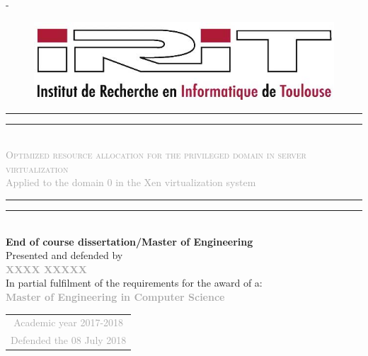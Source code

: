 \begin{titlingpage}
\begin{SingleSpace}

\begin{adjustwidth*}{\unitlength}{-\unitlength}
\begin{figure}
\centering 
\includegraphics[scale=0.5]{logos/IRIT-rd.jpg}
\end{figure}
\hspace{3cm}
\vspace{0.5cm}
\begin{center}
\rule[0.5ex]{\linewidth}{2pt}\vspace*{-\baselineskip}\vspace*{3.2pt}
\rule[0.5ex]{\linewidth}{1pt}\\[\baselineskip]
{\LARGE{\textcolor{darkgray} {\textsc{Optimized resource allocation for the privileged domain in server virtualization}
}}}\\[4mm]
{\Large \textcolor{darkgray}{Applied to the domain 0 in the Xen virtualization system}}\\
\rule[0.5ex]{\linewidth}{1pt}\vspace*{-\baselineskip}\vspace{3.2pt}
\rule[0.5ex]{\linewidth}{2pt}\\
\vspace{6mm}
{\Large \textbf{End of course dissertation/Master of Engineering}}\\
\vspace{6mm}
{\Large Presented and defended by } \\
\vspace{6mm}
{\Large \textsc{\textbf{\textcolor{darkgray}{XXXX XXXXX }}}}\\
\vspace{8mm}
{\Large In partial fulfilment of the requirements for the award of a:} \\
\vspace{6mm}
{\Large \textbf{\textcolor{darkgray}{Master of Engineering in Computer Science }}}\\
\vspace{6mm}
\vspace{4.5mm}
\begin{tabular}{c}
{\Large \textcolor{darkgray}{Academic year 2017-2018}}\\
{\Large \textcolor{darkgray}{Defended the 08 July 2018}}
\end{tabular}

\end{center}

\end{adjustwidth*}

\end{SingleSpace}
\end{titlingpage}
